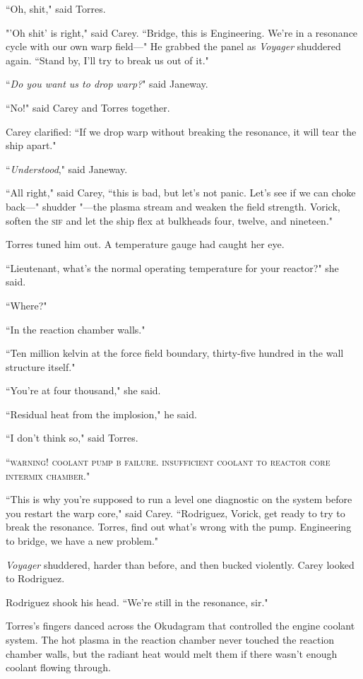 \documentclass[twoside,letterpaper,12pt]{memoir}
\begin{document}
``Oh, shit," said Torres.

"'Oh shit' is right," said Carey. ``Bridge, this is Engineering. We're in a resonance cycle with our own warp field---" He grabbed the panel as \textit{Voyager} shuddered again. ``Stand by, I'll try to break us out of it."

``\textit{Do you want us to drop warp?}" said Janeway.

``No!" said Carey and Torres together.

Carey clarified: ``If we drop warp without breaking the resonance, it will tear the ship apart."

``\textit{Understood}," said Janeway.

``All right," said Carey, ``this is bad, but let's not panic. Let's see if we can choke back---" shudder "---the plasma stream and weaken the field strength. Vorick, soften the \textsc{sif} and let the ship flex at bulkheads four, twelve, and nineteen."

Torres tuned him out. A temperature gauge had caught her eye.

``Lieutenant, what's the normal operating temperature for your reactor?" she said.

``Where?"

``In the reaction chamber walls."

``Ten million kelvin at the force field boundary, thirty-five hundred in the wall structure itself."

``You're at four thousand," she said.

``Residual heat from the implosion," he said.

``I don't think so," said Torres.

``\textsc{warning! coolant pump b failure. insufficient coolant to reactor core intermix chamber}."

``This is why you're supposed to run a level one diagnostic on the system before you restart the warp core," said Carey. ``Rodriguez, Vorick, get ready to try to break the resonance. Torres, find out what's wrong with the pump. Engineering to bridge, we have a new problem."

\textit{Voyager} shuddered, harder than before, and then bucked violently. Carey looked to Rodriguez.

Rodriguez shook his head. ``We're still in the resonance, sir."

Torres's fingers danced across the Okudagram that controlled the engine coolant system. The hot plasma in the reaction chamber never touched the reaction chamber walls, but the radiant heat would melt them if there wasn't enough coolant flowing through.
\end{document}
